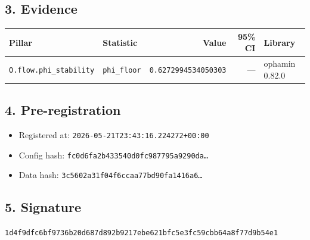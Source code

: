 \documentclass{article}
\begin{document}
\subsection*{3. Evidence}
\begin{tabular}{llrrl}\toprule
\textbf{Pillar} & \textbf{Statistic} & \textbf{Value} & \textbf{95\% CI} & \textbf{Library} \\\midrule
\texttt{O.flow.phi\_stability} & \texttt{phi\_floor} & \texttt{0.6272994534050303} & --- & ophamin 0.82.0 \\
\bottomrule\end{tabular}
\subsection*{4. Pre-registration}
\begin{itemize}
\item Registered at: \texttt{2026-05-21T23:43:16.224272+00:00}
\item Config hash: \texttt{fc0d6fa2b433540d0fc987795a9290da\dots}
\item Data hash: \texttt{3c5602a31f04f6ccaa77bd90fa1416a6\dots}
\end{itemize}
\subsection*{5. Signature}
\texttt{1d4f9dfc6bf9736b20d687d892b9217ebe621bfc5e3fc59cbb64a8f77d9b54e1}\\
\end{document}
